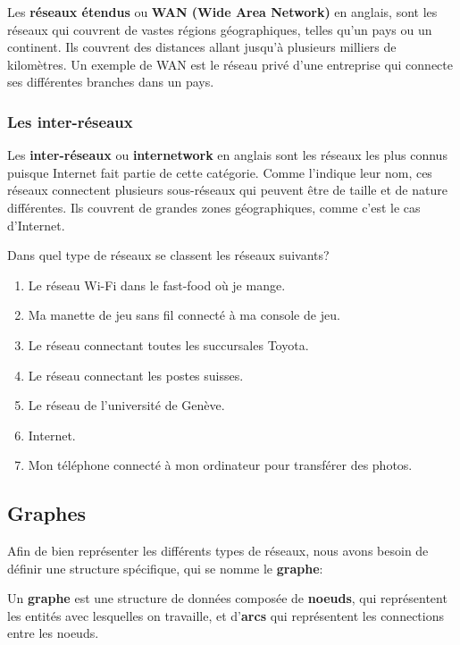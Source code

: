 \documentclass[11pt, a4paper]{book}
\begin{document}
Les {\bf réseaux étendus} ou {\bf WAN (Wide Area Network)} en anglais,  sont les réseaux qui couvrent de vastes régions géographiques, telles qu'un pays ou un continent. Ils couvrent des distances allant jusqu'à plusieurs milliers de kilomètres. Un exemple de WAN est le réseau privé d'une entreprise qui connecte ses différentes branches dans un pays.

\subsubsection{Les inter-réseaux}

Les {\bf inter-réseaux} ou {\bf internetwork} en anglais sont les réseaux les plus connus puisque Internet fait partie de cette catégorie. Comme l'indique leur nom, ces réseaux connectent plusieurs sous-réseaux  qui peuvent être de taille et de nature différentes. Ils couvrent de grandes zones géographiques, comme c'est le cas d'Internet.

\begin{exercice}
Dans quel type de réseaux se classent les réseaux suivants?
\begin{enumerate}
\item Le réseau Wi-Fi dans le fast-food où je mange.
\item Ma manette de jeu sans fil connecté à ma console de jeu.
\item Le réseau connectant toutes les succursales Toyota.
\item Le réseau connectant les postes suisses.
\item Le réseau de l'université de Genève.
\item Internet.
\item Mon téléphone connecté à mon ordinateur pour transférer des photos. 

\end{enumerate}



\end{exercice}




\subsection{Graphes}

Afin de bien représenter les différents types de réseaux, nous avons besoin de définir une structure spécifique, qui se nomme le {\bf graphe}:

\begin{defi}
Un {\bf graphe} est une structure de données composée de {\bf noeuds}, qui représentent les entités avec lesquelles on travaille, et d'{\bf arcs} qui représentent les connections entre les noeuds.

\end{defi}
\end{document}
